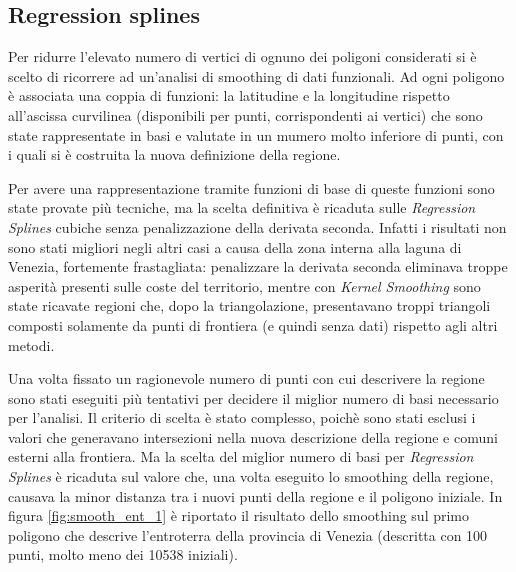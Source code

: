 \documentclass[a4paper,11pt,twoside,openright]{book}							%
\begin{document}
\subsection*{Regression splines}

Per ridurre l'elevato numero di vertici di ognuno dei poligoni considerati si è scelto di ricorrere ad un'analisi di smoothing di dati funzionali. Ad ogni poligono è associata una coppia di funzioni: la latitudine e la longitudine rispetto all'ascissa curvilinea (disponibili per punti, corrispondenti ai vertici) che sono state rappresentate in basi e valutate in un mumero molto inferiore di punti, con i quali si è costruita la nuova definizione della regione.

Per avere una rappresentazione tramite funzioni di base di queste funzioni sono state provate più tecniche, ma la scelta definitiva è ricaduta sulle \textit{Regression Splines} cubiche senza penalizzazione della derivata seconda. Infatti i risultati non sono stati migliori negli altri casi a causa della zona interna alla laguna di Venezia, fortemente frastagliata: penalizzare la derivata seconda eliminava troppe asperità presenti sulle coste del territorio, mentre con \textit{Kernel Smoothing} sono state ricavate regioni che, dopo la triangolazione, presentavano troppi triangoli composti solamente da punti di frontiera (e quindi senza dati) rispetto agli altri metodi.

Una volta fissato un ragionevole numero di punti con cui descrivere la regione sono stati eseguiti più tentativi per decidere il miglior numero di basi necessario per l'analisi. Il criterio di scelta è stato complesso, poichè sono stati esclusi i valori che generavano intersezioni nella nuova descrizione della regione e comuni esterni alla frontiera. Ma la scelta del miglior numero di basi per \textit{Regression Splines} è ricaduta sul valore che, una volta eseguito lo smoothing della regione, causava la minor distanza tra i nuovi punti della regione e il poligono iniziale. In figura \ref{fig:smooth_ent_1} è riportato il risultato dello smoothing sul primo poligono che descrive l'entroterra della provincia di Venezia (descritta con 100 punti, molto meno dei 10538 iniziali).  
\end{document}
